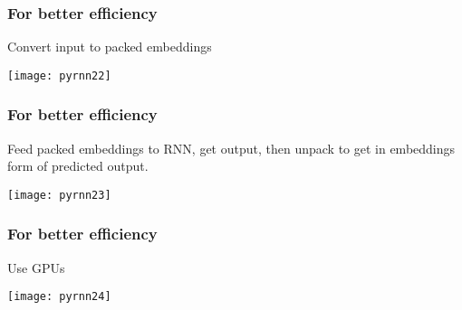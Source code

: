 \begin{frame}[fragile] \frametitle{For better efficiency}
Convert input to packed embeddings
\begin{center}
\texttt{[image: pyrnn22]}
\end{center}
\end{frame}

\begin{frame}[fragile] \frametitle{For better efficiency}
Feed packed embeddings to RNN, get output, then unpack to get in embeddings form of predicted output.
\begin{center}
\texttt{[image: pyrnn23]}
\end{center}
\end{frame}

\begin{frame}[fragile] \frametitle{For better efficiency}
Use GPUs
\begin{center}
\texttt{[image: pyrnn24]}
\end{center}
\end{frame}

    





